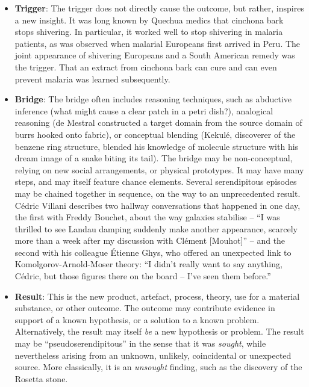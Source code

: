 \begin{itemize}
\item \textbf{Trigger}: The trigger does not directly
  cause the outcome, but rather, inspires a new insight.  It was long
  known by Quechua medics that cinchona bark stops shivering.  In
  particular, it worked well to stop shivering in malaria patients, as
  was observed when malarial Europeans first arrived in Peru.  The
  joint appearance of shivering Europeans and a South American remedy
  was the trigger.  That an extract from cinchona bark can cure and
  can even prevent malaria was learned subsequently.
\end{itemize}

\begin{itemize}
\item \textbf{Bridge}: The bridge often includes reasoning techniques,
  such as abductive inference (what might cause a clear patch in a
  petri dish?), analogical reasoning (de Mestral constructed a target
  domain from the source domain of burrs hooked onto fabric), or
  conceptual blending (Kekul\'e, discoverer of the benzene ring
  structure, blended his knowledge of molecule structure with his
  dream image of a snake biting its tail).  The bridge may be
  non-conceptual, relying on new social arrangements, or physical
  prototypes.  It may have many steps, and may itself feature chance
  elements.  Several serendipitous episodes may be chained together in
  sequence, on the way to an unprecedented result.  C\'edric Villani
  \citeyear[pp.~15--16]{birth-of-a-theorem} describes two hallway
  conversations that happened in one day, the first with Freddy
  Bouchet, about the way galaxies stabilise -- ``I was thrilled to see
  Landau damping suddenly make another appearance, scarcely more than
  a week after my discussion with Cl\'ement [Mouhot]'' -- and the
  second with his colleague \'Etienne Ghys, who offered an unexpected
  link to Komolgorov-Arnold-Moser theory: ``I didn't really want to
  say anything, C\'edric, but those figures there on the board -- I've
  seen them before.''
\end{itemize}

\begin{itemize}
\item \textbf{Result}: This is the new product, artefact, process,
  theory, use for a material substance, or other outcome.  The
  outcome may contribute evidence in support of a known hypothesis, or
  a solution to a known problem.  Alternatively, the result may itself
  {\em be} a new hypothesis or problem.  The result may be
  ``pseudoserendipitous'' in the sense that it was {\em sought}, while
  nevertheless arising from an unknown, unlikely, coincidental or
  unexpected source.  More classically, it is an \emph{unsought}
  finding, such as the discovery of the Rosetta stone.
\end{itemize}

